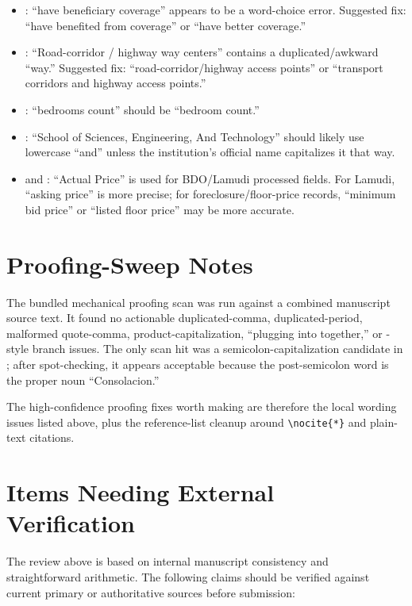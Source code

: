 \documentclass[11pt]{article}
\begin{document}
\begin{itemize}
\item {}: ``have beneficiary coverage'' appears to be a word-choice error. Suggested fix: ``have benefited from coverage'' or ``have better coverage.''
\item {}: ``Road-corridor / highway way centers'' contains a duplicated/awkward ``way.'' Suggested fix: ``road-corridor/highway access points'' or ``transport corridors and highway access points.''
\item {}: ``bedrooms count'' should be ``bedroom count.''
\item {}: ``School of Sciences, Engineering, And Technology'' should likely use lowercase ``and'' unless the institution's official name capitalizes it that way.
\item {} and : ``Actual Price'' is used for BDO/Lamudi processed fields. For Lamudi, ``asking price'' is more precise; for foreclosure/floor-price records, ``minimum bid price'' or ``listed floor price'' may be more accurate.
\end{itemize}

\section*{Proofing-Sweep Notes}

The bundled mechanical proofing scan was run against a combined manuscript source text. It found no actionable duplicated-comma, duplicated-period, malformed quote-comma, product-capitalization, ``plugging into together,'' or -style branch issues. The only scan hit was a semicolon-capitalization candidate in ; after spot-checking, it appears acceptable because the post-semicolon word is the proper noun ``Consolacion.''

The high-confidence proofing fixes worth making are therefore the local wording issues listed above, plus the reference-list cleanup around \verb|\nocite{*}| and plain-text citations.

\section*{Items Needing External Verification}

The review above is based on internal manuscript consistency and straightforward arithmetic. The following claims should be verified against current primary or authoritative sources before submission:
\end{document}
